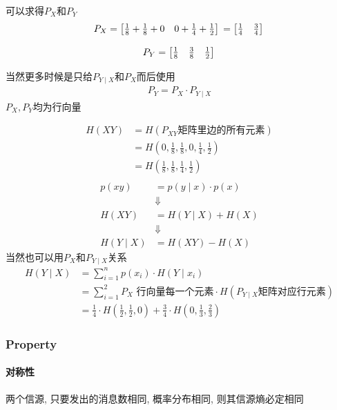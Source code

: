 \documentclass[a4paper]{report}
\begin{document}
 可以求得$P_X$和$P_Y$
 \[
   P_X=
  \begin{bmatrix}
    \frac{1}{8}+\frac{1}{8}+0&0+\frac{1}{4}+\frac{1}{2}
  \end{bmatrix}\\
  =
    \begin{bmatrix}
    \frac{1}{4}&\frac{3}{4}
  \end{bmatrix}\\
   \]

 \[
   P_Y=
    \begin{bmatrix}
    \frac{1}{8}&\frac{3}{8}&\frac{1}{2}
  \end{bmatrix}\\
   \]

   当然更多时候是只给$P_{Y\mid X}$和$P_{X}$而后使用
   \begin{align}
    P_Y=P_X\cdot P_{Y\mid X}
   \end{align}
   $P_X,P_Y$均为行向量

 \begin{align*}
   H(XY)&=H(P_{XY}\text{矩阵里边的所有元素})\\
   &=H(0,\frac{1}{8},\frac{1}{8},0,\frac{1}{4},\frac{1}{2})\\
   &=H(\frac{1}{8},\frac{1}{8},\frac{1}{4},\frac{1}{2})\\
 \end{align*}
 \begin{align*}
  p(xy) &=p(y\mid x)\cdot p(x)
  \\   &\Downarrow 
  \\   H(XY)&=H(Y\mid X)+H(X)
  \\   &\Downarrow
  \\ H(Y\mid X) &=H(XY)-H(X)
 \end{align*}
 当然也可以用$P_X$和$P_{Y\mid X}$关系
 \begin{align*}
  H(Y\mid X)&=\displaystyle\sum_{i=1}^{n} p(x_i)\cdot H(Y\mid x_i)
  \\ &= \displaystyle\sum_{i=1}^{2} \text{$P_X$ 行向量每一个元素}\cdot H(\text{$P_{Y\mid X}$矩阵对应行元素})
  \\ &= \frac{1}{4}\cdot H(\frac{1}{2},\frac{1}{2},0)+\frac{3}{4}\cdot H(0,\frac{1}{3},\frac{2}{3})
 \end{align*}

\subsubsection{Property}
\paragraph{对称性}
两个信源, 只要发出的消息数相同, 概率分布相同, 则其信源熵必定相同
\end{document}
